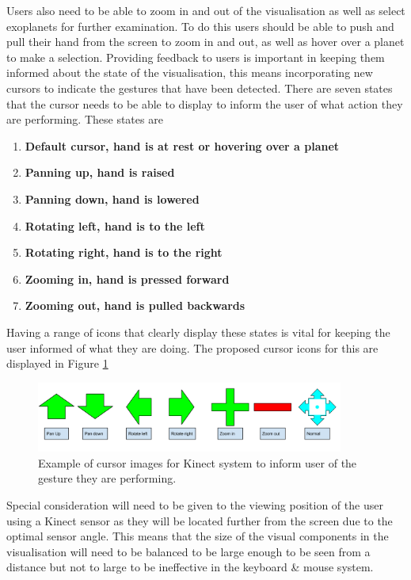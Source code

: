 \begin{enumerate}
Users also need to be able to
zoom in and out of the visualisation as well as select exoplanets for further
examination. To do this users should be able to
push and pull their hand from the screen to zoom in and out, as well as
hover over a planet to make a selection. Providing feedback to users is
important in keeping them informed about the
state of the visualisation, this means
incorporating new cursors to indicate the gestures that have been detected.
There are seven states that the cursor needs to be able to display to inform the
user
of what action they are performing. These states are

\begin{enumerate}
\item[1.]  {\bf Default cursor, hand is at rest or hovering over a planet}
 \item[2.] {\bf Panning up, hand is raised}
 \item[3.] {\bf Panning down, hand is lowered}
 \item[4.] {\bf Rotating left, hand is to the left}
 \item[5.] {\bf Rotating right, hand is to the right}
 \item[6.] {\bf Zooming in, hand is pressed forward}
 \item[7.] {\bf Zooming out, hand is pulled backwards}
 
\end{enumerate}
Having a range of icons that clearly display these states is vital for keeping
the user informed of what they are doing. The proposed cursor icons for this are
displayed in Figure \ref{fig:cursors}
\begin{figure}[H]
  \centering
      \includegraphics[width=0.9\textwidth]{images/curserImages.png}
  \caption[Example of cursor images for Kinect system]{Example of cursor images
for Kinect system to inform user of the gesture they are performing.}  
  \label{fig:cursors}
\end{figure}

Special consideration will need to be given to the viewing position of the user
using a Kinect sensor as they will be located further from the screen due to the
optimal sensor angle. This means that the size of the visual components in the
visualisation will need to be balanced to be large enough to be seen from a
distance but not to large to be ineffective in the keyboard \& mouse system.


\end{enumerate}
